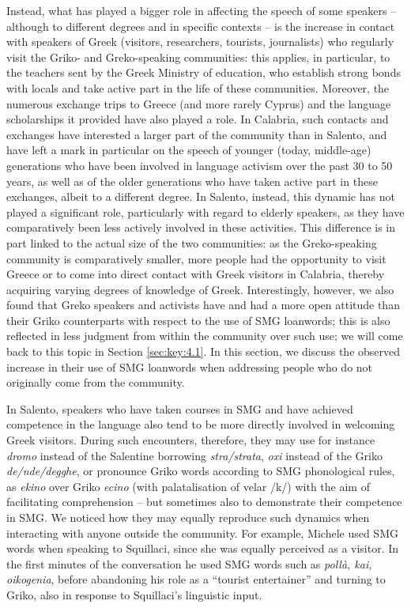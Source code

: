 \documentclass[output=paper,hidelinks]{langscibook}
\begin{document}
Instead, what has played a bigger role in affecting the speech of some speakers -- although to different degrees and in specific contexts -- is the increase in contact with speakers of Greek (visitors, researchers, tourists, journalists) who regularly visit the Griko- and Greko-speaking communities: this applies, in particular, to the teachers sent by the Greek Ministry of education, who establish strong bonds with locals and take active part in the life of these communities. Moreover, the numerous exchange trips to Greece (and more rarely Cyprus) and the language scholarships it provided have also played a role. In Calabria, such contacts and exchanges have interested a larger part of the community than in Salento, and have left a mark in particular on the speech of younger (today, middle-age) generations who have been involved in language activism over the past 30 to 50 years, as well as of the older generations who have taken active part in these exchanges, albeit to a different degree. In Salento, instead, this dynamic has not played a significant role, particularly with regard to elderly speakers, as they have comparatively been less actively involved in these activities. This difference is in part linked to the actual size of the two communities: as the Greko-speaking community is comparatively smaller, more people had the opportunity to visit Greece or to come into direct contact with Greek visitors in Calabria, thereby acquiring varying degrees of knowledge of Greek. Interestingly, however, we also found that Greko speakers and activists have and had a more open attitude than their Griko counterparts with respect to the use of SMG loanwords; this is also reflected in less judgment from within the community over such use; we will come back to this topic in Section \ref{sec:key:4.1}. In this section, we discuss the observed increase in their use of SMG loanwords when addressing people who do not originally come from the community.



In Salento, speakers who have taken courses in SMG and have achieved competence in the language also tend to be more directly involved in welcoming Greek visitors. During such encounters, therefore, they may use for instance \textit{dromo} instead of the Salentine borrowing \textit{stra/strata}, \textit{oxi} instead of the Griko \textit{de/nde/degghe}, or pronounce Griko words according to SMG phonological rules, as \textit{ekino} over Griko \textit{ecino} (with palatalisation of velar /k/) with the aim of facilitating comprehension -- but sometimes also to demonstrate their competence in SMG. We noticed how they may equally reproduce such dynamics when interacting with anyone outside the community. For example, Michele used SMG words when speaking to Squillaci, since she was equally perceived as a visitor. In the first minutes of the conversation he used SMG words such as \textit{pollà, kai, oikogenia}, before abandoning his role as a ``tourist entertainer'' and turning to Griko, also in response to Squillaci’s linguistic input. 
\end{document}
